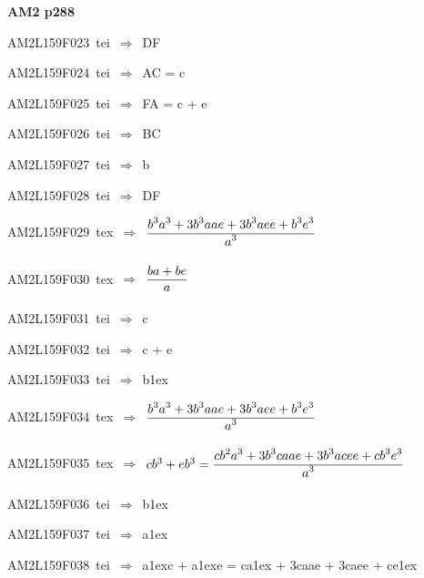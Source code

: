 \par\vfill\eject
{\bf\hfill AM2 p288\hfill\hbox{}}\par\bigskip
{\sixrm AM2L159F023\ {\sixit tei}\ }$\Rightarrow$\ DF\par\smallskip
{\sixrm AM2L159F024\ {\sixit tei}\ }$\Rightarrow$\ AC = {\tenit c}\par\smallskip
{\sixrm AM2L159F025\ {\sixit tei}\ }$\Rightarrow$\ FA = {\tenit c} + {\tenit e}\par\smallskip
{\sixrm AM2L159F026\ {\sixit tei}\ }$\Rightarrow$\ BC\par\smallskip
{\sixrm AM2L159F027\ {\sixit tei}\ }$\Rightarrow$\ {\tenit b}\par\smallskip
{\sixrm AM2L159F028\ {\sixit tei}\ }$\Rightarrow$\ DF\par\smallskip
{\sixrm AM2L159F029\ {\sixit tex}\ }$\Rightarrow$\ ${\displaystyle\strut {b^{3}a^{3} + 3b^{3}aae + 3b^{3}aee + b^{3}e^{3}}\over \displaystyle\strut a^{3}}$\par\smallskip
{\sixrm AM2L159F030\ {\sixit tex}\ }$\Rightarrow$\ ${\displaystyle\strut {ba + be}\over \displaystyle\strut a}$\par\smallskip
{\sixrm AM2L159F031\ {\sixit tei}\ }$\Rightarrow$\ {\tenit c}\par\smallskip
{\sixrm AM2L159F032\ {\sixit tei}\ }$\Rightarrow$\ {\tenit c} + {\tenit e}\par\smallskip
{\sixrm AM2L159F033\ {\sixit tei}\ }$\Rightarrow$\ {\tenit b}\raise1ex\hbox{}\par\smallskip
{\sixrm AM2L159F034\ {\sixit tex}\ }$\Rightarrow$\ ${\displaystyle\strut {b^{3}a^{3} + 3b^{3}aae + 3b^{3}aee + b^{3}e^{3}}\over \displaystyle\strut a^{3}}$\par\smallskip
{\sixrm AM2L159F035\ {\sixit tex}\ }$\Rightarrow$\ $cb^{3} + eb^{3} = {\displaystyle\strut {cb^{2}a^{3} + 3b^{3}caae + 3b^{3}acee + cb^{3}e^{3}}\over \displaystyle\strut a^{3}}$\par\smallskip
{\sixrm AM2L159F036\ {\sixit tei}\ }$\Rightarrow$\ {\tenit b}\raise1ex\hbox{}\par\smallskip
{\sixrm AM2L159F037\ {\sixit tei}\ }$\Rightarrow$\ {\tenit a}\raise1ex\hbox{}\par\smallskip
{\sixrm AM2L159F038\ {\sixit tei}\ }$\Rightarrow$\ {\tenit a}\raise1ex\hbox{}{\tenit c} + {\tenit a}\raise1ex\hbox{}{\tenit e} = {\tenit ca}\raise1ex\hbox{} + 3{\tenit caae} + 3{\tenit caee} + {\tenit ce}\raise1ex\hbox{}\par\smallskip
